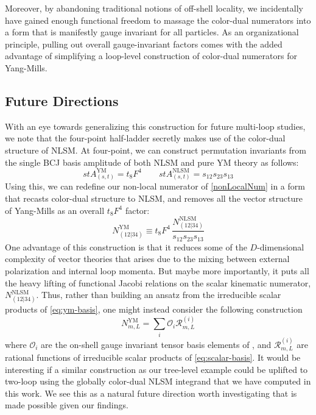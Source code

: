 \documentclass[11pt,letter]{article}
\def\be{\begin{equation}}
\def\ee{\end{equation}}
\begin{document}
Moreover, by abandoning traditional notions of off-shell
locality, we incidentally have gained enough functional freedom to massage the
color-dual numerators into a form that is manifestly gauge invariant
for all particles. As an organizational principle, pulling out overall
gauge-invariant factors comes with the added advantage of simplifying
a loop-level construction of color-dual numerators for Yang-Mills.

\subsection{Future Directions}\label{sec:Discussion}
With an eye towards generalizing this construction for future multi-loop studies, we note that the four-point half-ladder secretly makes use of the color-dual structure of NLSM. At four-point, we can construct permutation invariants from the single BCJ basis amplitude of both NLSM and pure YM theory as follows:
\be
s t A^{\text{YM}}_{(s,t)} = t_8F^4 \qquad s t A^{\text{NLSM}}_{(s,t)} = s_{12}s_{23}s_{13}
\ee
Using this, we can redefine our non-local numerator of \cref{nonLocalNum} in a form that recasts color-dual structure to NLSM, and removes all the vector structure of Yang-Mills as an overall $t_8F^4$ factor:
\be
N_{(12|34)}^{\text{YM}} \equiv t_8F^4 \,\frac{N_{(12|34)}^{\text{NLSM}}}{s_{12}s_{23}s_{13}} 
\ee
One advantage of this construction is that it reduces some of the $D$-dimensional complexity of vector theories that arises due to the mixing between external polarization and
internal loop momenta. But maybe more importantly, it puts all the heavy lifting of functional Jacobi relations on the scalar kinematic numerator, $N_{(12|34)}^{\text{NLSM}}$. Thus, rather
than building an ansatz from the irreducible scalar products of
\cref{eq:ym-basis}, one might instead consider the following construction
\begin{equation}
N^{\text{YM}}_{m,L} = \sum_i \mathcal{O}_i \mathcal{R}^{(i)}_{m,L}
\end{equation}
where $\mathcal{O}_i$ are the on-shell gauge invariant tensor basis elements of
\cite{Bern:2017tuc,Carrasco:2019yyn}, and $ \mathcal{R}^{(i)}_{m,L}$ are
rational functions of irreducible scalar products of \cref{eq:scalar-basis}. It would be interesting if a similar construction as our tree-level example could be uplifted to two-loop using the globally color-dual NLSM integrand that we have computed in this work. We see this as a natural future direction worth investigating that is made possible given our findings.
\end{document}
